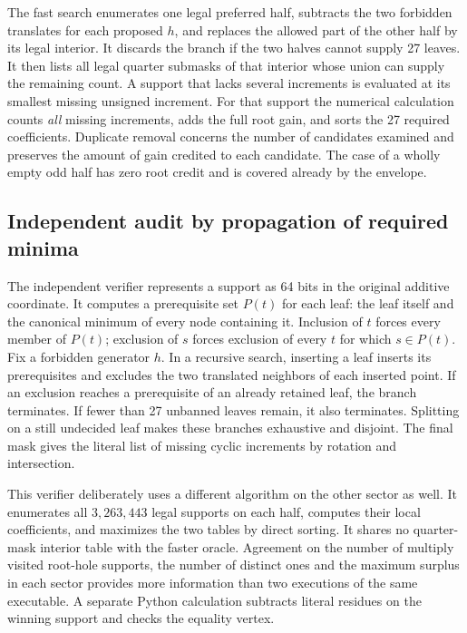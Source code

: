 \documentclass[12pt,letterpaper]{article}
\begin{document}
The fast search enumerates one legal preferred half, subtracts the two forbidden translates for each proposed \(h\), and replaces the allowed part of the other half by its legal interior. It discards the branch if the two halves cannot supply 27 leaves. It then lists all legal quarter submasks of that interior whose union can supply the remaining count. A support that lacks several increments is evaluated at its smallest missing unsigned increment. For that support the numerical calculation counts \emph{all} missing increments, adds the full root gain, and sorts the 27 required coefficients. Duplicate removal concerns the number of candidates examined and preserves the amount of gain credited to each candidate. The case of a wholly empty odd half has zero root credit and is covered already by the envelope.

\subsection{Independent audit by propagation of required minima}

The independent verifier represents a support as 64 bits in the original additive coordinate. It computes a prerequisite set \(P(t)\) for each leaf: the leaf itself and the canonical minimum of every node containing it. Inclusion of \(t\) forces every member of \(P(t)\); exclusion of \(s\) forces exclusion of every \(t\) for which \(s\in P(t)\). Fix a forbidden generator \(h\). In a recursive search, inserting a leaf inserts its prerequisites and excludes the two translated neighbors of each inserted point. If an exclusion reaches a prerequisite of an already retained leaf, the branch terminates. If fewer than 27 unbanned leaves remain, it also terminates. Splitting on a still undecided leaf makes these branches exhaustive and disjoint. The final mask gives the literal list of missing cyclic increments by rotation and intersection.

This verifier deliberately uses a different algorithm on the other sector as well. It enumerates all \(3{,}263{,}443\) legal supports on each half, computes their local coefficients, and maximizes the two tables by direct sorting. It shares no quarter-mask interior table with the faster oracle. Agreement on the number of multiply visited root-hole supports, the number of distinct ones and the maximum surplus in each sector provides more information than two executions of the same executable. A separate Python calculation subtracts literal residues on the winning support and checks the equality vertex.
\end{document}
